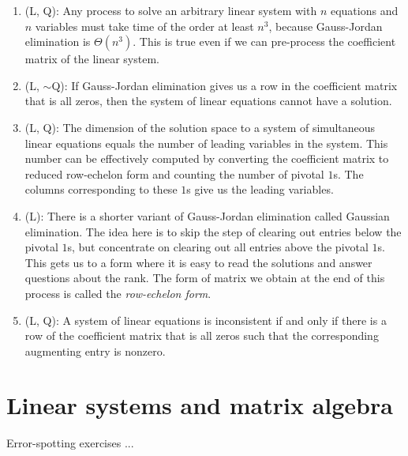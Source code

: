 \documentclass[10pt]{amsart}
\begin{document}
\begin{enumerate}
\item (L, Q): Any process to solve an arbitrary linear system with $n$
  equations and $n$ variables must take time of the order at least
  $n^3$, because Gauss-Jordan elimination is $\Theta(n^3)$. This is
  true even if we can pre-process the coefficient matrix of the linear
  system.
\item (L, $\sim$Q): If Gauss-Jordan elimination gives us a row in the
  coefficient matrix that is all zeros, then the system of linear
  equations cannot have a solution.
\item (L, Q): The dimension of the solution space to a system of
  simultaneous linear equations equals the number of leading variables
  in the system. This number can be effectively computed by converting
  the coefficient matrix to reduced row-echelon form and counting the
  number of pivotal $1$s. The columns corresponding to these $1$s give
  us the leading variables.
\item (L): There is a shorter variant of Gauss-Jordan elimination called
  Gaussian elimination. The idea here is to skip the step of clearing
  out entries below the pivotal $1$s, but concentrate on clearing out
  all entries above the pivotal $1$s. This gets us to a form where it
  is easy to read the solutions and answer questions about the
  rank. The form of matrix we obtain at the end of this process is
  called the {\em row-echelon form}.
\item (L, Q): A system of linear equations is inconsistent if and only
  if there is a row of the coefficient matrix that is all zeros such
  that the corresponding augmenting entry is nonzero.
\end{enumerate}

\section{Linear systems and matrix algebra}

Error-spotting exercises ...
\end{document}
